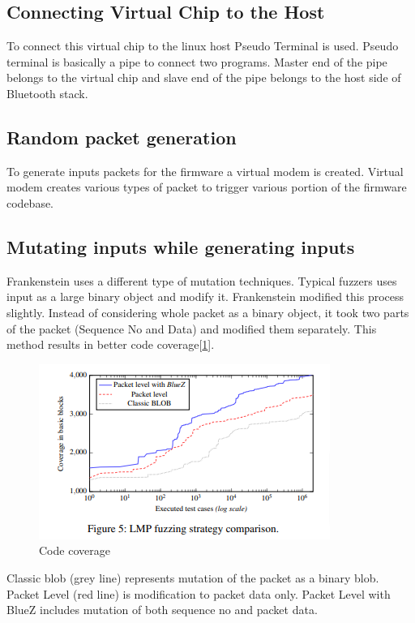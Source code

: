\documentclass[letterpaper,11pt]{article}
\begin{document}
\subsection{Connecting Virtual Chip to the Host}
To connect this virtual chip to the linux host Pseudo Terminal is used. Pseudo terminal is basically a pipe to connect two programs. Master end of the pipe belongs to the virtual chip and slave end of the pipe belongs to the host side of Bluetooth stack.
\subsection{Random packet generation} 
To generate inputs packets for the firmware a virtual modem is created. Virtual modem creates various types of packet to trigger various portion of the firmware codebase.
\subsection{Mutating inputs while generating inputs} 
Frankenstein uses a different type of mutation techniques. Typical fuzzers uses input as a large binary object and modify it. Frankenstein modified this process slightly. Instead of considering whole packet as a binary object, it took two parts of the packet (Sequence No and Data) and modified them separately. 
This method results in better code coverage[\ref{fig:Code coverage}].
\begin{figure}[htp]
    \centering
    \includegraphics{images/code-coverage.png}
    \caption{Code coverage}
    \label{fig:Code coverage}
\end{figure}
Classic blob (grey line) represents mutation of the packet as a binary blob. Packet Level (red line) is modification to packet data only. Packet Level with BlueZ includes mutation of both sequence no and packet data.
\end{document}
